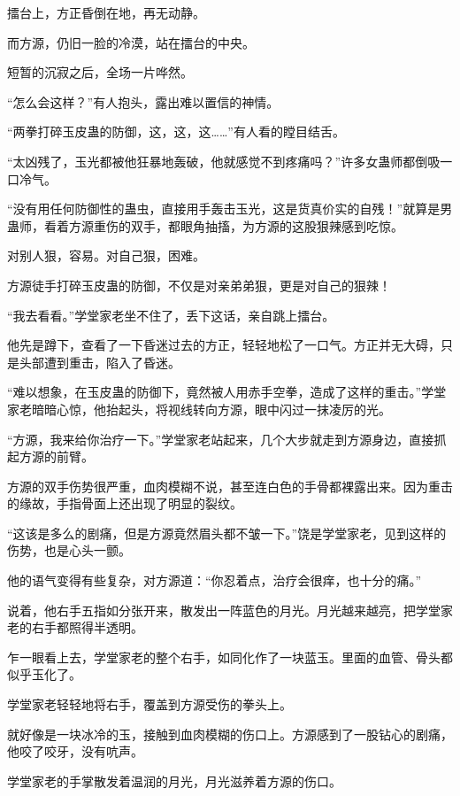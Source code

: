 
\begin{this_body}

擂台上，方正昏倒在地，再无动静。

而方源，仍旧一脸的冷漠，站在擂台的中央。

短暂的沉寂之后，全场一片哗然。

“怎么会这样？”有人抱头，露出难以置信的神情。

“两拳打碎玉皮蛊的防御，这，这，这……”有人看的瞠目结舌。

“太凶残了，玉光都被他狂暴地轰破，他就感觉不到疼痛吗？”许多女蛊师都倒吸一口冷气。

“没有用任何防御性的蛊虫，直接用手轰击玉光，这是货真价实的自残！”就算是男蛊师，看着方源重伤的双手，都眼角抽搐，为方源的这股狠辣感到吃惊。

对别人狠，容易。对自己狠，困难。

方源徒手打碎玉皮蛊的防御，不仅是对亲弟弟狠，更是对自己的狠辣！

“我去看看。”学堂家老坐不住了，丢下这话，亲自跳上擂台。

他先是蹲下，查看了一下昏迷过去的方正，轻轻地松了一口气。方正并无大碍，只是头部遭到重击，陷入了昏迷。

“难以想象，在玉皮蛊的防御下，竟然被人用赤手空拳，造成了这样的重击。”学堂家老暗暗心惊，他抬起头，将视线转向方源，眼中闪过一抹凌厉的光。

“方源，我来给你治疗一下。”学堂家老站起来，几个大步就走到方源身边，直接抓起方源的前臂。

方源的双手伤势很严重，血肉模糊不说，甚至连白色的手骨都裸露出来。因为重击的缘故，手指骨面上还出现了明显的裂纹。

“这该是多么的剧痛，但是方源竟然眉头都不皱一下。”饶是学堂家老，见到这样的伤势，也是心头一颤。

他的语气变得有些复杂，对方源道：“你忍着点，治疗会很痒，也十分的痛。”

说着，他右手五指如分张开来，散发出一阵蓝色的月光。月光越来越亮，把学堂家老的右手都照得半透明。

乍一眼看上去，学堂家老的整个右手，如同化作了一块蓝玉。里面的血管、骨头都似乎玉化了。

学堂家老轻轻地将右手，覆盖到方源受伤的拳头上。

就好像是一块冰冷的玉，接触到血肉模糊的伤口上。方源感到了一股钻心的剧痛，他咬了咬牙，没有吭声。

学堂家老的手掌散发着温润的月光，月光滋养着方源的伤口。


\end{this_body}
